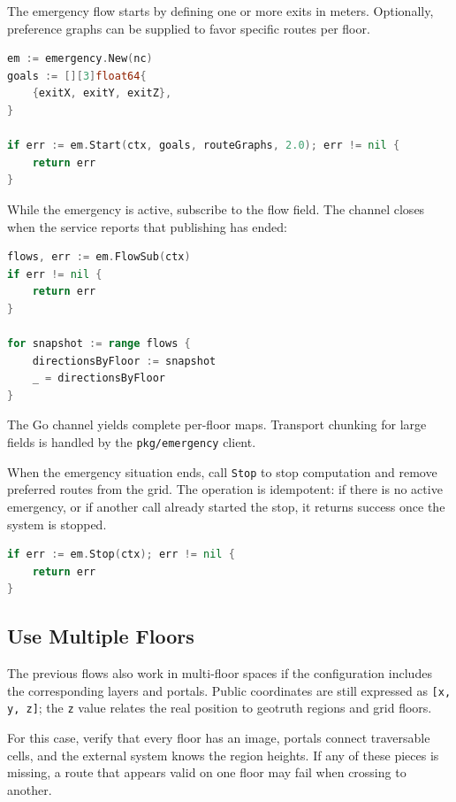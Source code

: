 \documentclass[12pt,a4paper]{report}
\begin{document}
The emergency flow starts by defining one or more exits in meters. Optionally,
preference graphs can be supplied to favor specific routes per floor.

\begin{lstlisting}[language=Go]
em := emergency.New(nc)
goals := [][3]float64{
    {exitX, exitY, exitZ},
}

if err := em.Start(ctx, goals, routeGraphs, 2.0); err != nil {
    return err
}
\end{lstlisting}

While the emergency is active, subscribe to the flow field. The channel closes
when the service reports that publishing has ended:

\begin{lstlisting}[language=Go]
flows, err := em.FlowSub(ctx)
if err != nil {
    return err
}

for snapshot := range flows {
    directionsByFloor := snapshot
    _ = directionsByFloor
}
\end{lstlisting}

The Go channel yields complete per-floor maps. Transport chunking for large
fields is handled by the \texttt{pkg/emergency} client.

When the emergency situation ends, call \texttt{Stop} to stop computation and
remove preferred routes from the grid. The operation is idempotent: if there is
no active emergency, or if another call already started the stop, it returns
success once the system is stopped.

\begin{lstlisting}[language=Go]
if err := em.Stop(ctx); err != nil {
    return err
}
\end{lstlisting}

\subsection{Use Multiple Floors}

The previous flows also work in multi-floor spaces if the configuration includes
the corresponding layers and portals. Public coordinates are still expressed as
\texttt{[x, y, z]}; the \texttt{z} value relates the real position to geotruth
regions and grid floors.

For this case, verify that every floor has an image, portals connect traversable
cells, and the external system knows the region heights. If any of these pieces
is missing, a route that appears valid on one floor may fail when crossing to
another.
\end{document}

